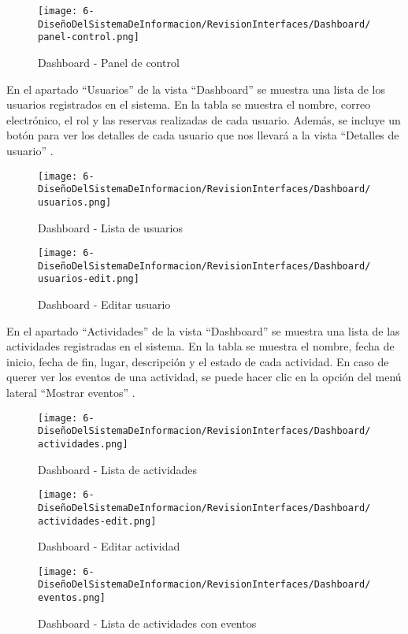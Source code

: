 \begin{figure}[H]
	\centering
	\texttt{[image: 6-DiseñoDelSistemaDeInformacion/RevisionInterfaces/Dashboard/panel-control.png]}
	\caption{Dashboard - Panel de control}
\end{figure}


En el apartado “Usuarios” de la vista “Dashboard” se muestra una lista de los usuarios registrados en el sistema.
En la tabla se muestra el nombre, correo electrónico, el rol y las reservas realizadas de cada usuario.
Además, se incluye un botón para ver los detalles de cada usuario que nos llevará a la vista “Detalles de usuario” .

\begin{figure}[H]
	\centering
	\texttt{[image: 6-DiseñoDelSistemaDeInformacion/RevisionInterfaces/Dashboard/usuarios.png]}
	\caption{Dashboard - Lista de usuarios}
\end{figure}

\begin{figure}[H]
	\centering
	\texttt{[image: 6-DiseñoDelSistemaDeInformacion/RevisionInterfaces/Dashboard/usuarios-edit.png]}
	\caption{Dashboard - Editar usuario}
\end{figure}

En el apartado “Actividades” de la vista “Dashboard” se muestra una lista de las actividades registradas en el sistema.
En la tabla se muestra el nombre, fecha de inicio, fecha de fin, lugar, descripción y el estado de cada actividad.
En caso de querer ver los eventos de una actividad, se puede hacer clic en la opción del menú lateral “Mostrar eventos” .

\begin{figure}[H]
	\centering
	\texttt{[image: 6-DiseñoDelSistemaDeInformacion/RevisionInterfaces/Dashboard/actividades.png]}
	\caption{Dashboard - Lista de actividades}
\end{figure}

\begin{figure}[H]
	\centering
	\texttt{[image: 6-DiseñoDelSistemaDeInformacion/RevisionInterfaces/Dashboard/actividades-edit.png]}
	\caption{Dashboard - Editar actividad}
\end{figure}

\begin{figure}[H]
	\centering
	\texttt{[image: 6-DiseñoDelSistemaDeInformacion/RevisionInterfaces/Dashboard/eventos.png]}
	\caption{Dashboard - Lista de actividades con eventos}
\end{figure}

